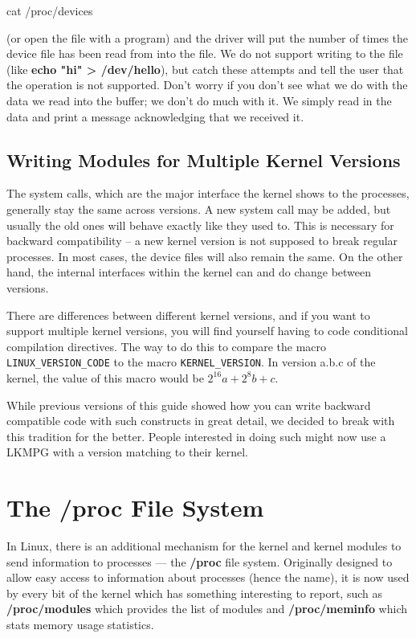 \documentclass[10pt, oneside]{book}
\begin{document}
\begin{codebash}
cat /proc/devices
\end{codebash}

(or open the file with a program) and the driver will put the number of times the device file has been read from into the file.
We do not support writing to the file (like \textbf{echo "hi" > /dev/hello}), but catch these attempts and tell the user that the operation is not supported.
Don't worry if you don't see what we do with the data we read into the buffer; we don't do much with it.
We simply read in the data and print a message acknowledging that we received it.


\subsection{Writing Modules for Multiple Kernel Versions}
\label{sec:modules_for_versions}
The system calls, which are the major interface the kernel shows to the processes, generally stay the same across versions.
A new system call may be added, but usually the old ones will behave exactly like they used to.
This is necessary for backward compatibility -- a new kernel version is not supposed to break regular processes.
In most cases, the device files will also remain the same. On the other hand, the internal interfaces within the kernel can and do change between versions.

There are differences between different kernel versions, and if you want to support multiple kernel versions, you will find yourself having to code conditional compilation directives.
The way to do this to compare the macro \verb|LINUX_VERSION_CODE| to the macro \verb|KERNEL_VERSION|.
In version a.b.c of the kernel, the value of this macro would be \(2^{16}a+2^{8}b+c\).

While previous versions of this guide showed how you can write backward compatible code with such constructs in great detail, we decided to break with this tradition for the better.
People interested in doing such might now use a LKMPG with a version matching to their kernel.

\section{The /proc File System}
\label{sec:procfs}
In Linux, there is an additional mechanism for the kernel and kernel modules to send information to processes --- the \textbf{/proc} file system.
Originally designed to allow easy access to information about processes (hence the name), it is now used by every bit of the kernel which has something interesting to report, such as \textbf{/proc/modules} which provides the list of modules and \textbf{/proc/meminfo} which stats memory usage statistics.
\end{document}
